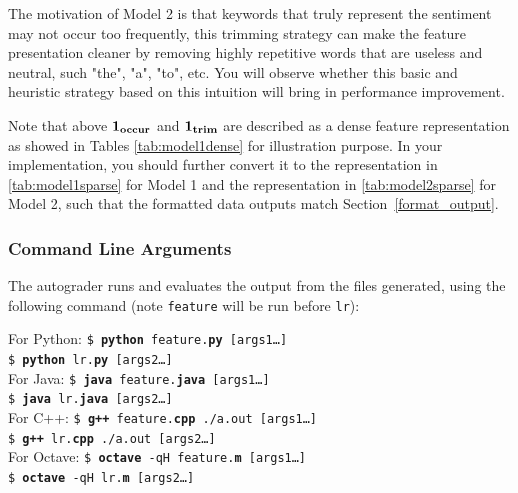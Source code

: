 \documentclass[11pt]{article}
\numberwithin{equation}{section} %
\numberwithin{figure}{section} %
\numberwithin{table}{section} %
\begin{document}
The motivation of Model 2 is that keywords that truly represent the sentiment may not occur too frequently, this trimming strategy can make the feature presentation cleaner by removing highly repetitive words that are useless and neutral, such "the", "a", "to", etc. You will observe whether this basic and heuristic strategy based on this intuition will bring in performance improvement.

Note that above $\bf{1}_{occur}$ and $\bf{1}_{trim}$ are described as a dense feature representation as showed in Tables \ref{tab:model1dense} for illustration purpose. In your implementation, you should further convert it to the representation in \ref{tab:model1sparse} for Model 1 and the representation in \ref{tab:model2sparse} for Model 2, such that the formatted data outputs match Section~\ref{format_output}.



\subsubsection{Command Line Arguments}
The autograder runs and evaluates the output from the files generated, using the following command (note \lstinline{feature} will be run before \lstinline{lr}):

\begin{tabbing}
For Python: \=\texttt{\$ \textbf{python} feature.\textbf{py} [args1\dots]}\\
\>\texttt{\$ \textbf{python} lr.\textbf{py} [args2\dots]}\\
For Java: \>\texttt{\$ \textbf{java} feature.\textbf{java} [args1\dots]}\\
\>\texttt{\$ \textbf{java} lr.\textbf{java} [args2\dots]}\\
For C++: \>\texttt{\$ \textbf{g++} feature.\textbf{cpp} ./a.out [args1\dots]}\\
\>\texttt{\$ \textbf{g++} lr.\textbf{cpp} ./a.out [args2\dots]}\\
For Octave: \>\texttt{\$ \textbf{octave} -qH feature.\textbf{m} [args1\dots]}\\
\>\texttt{\$ \textbf{octave} -qH lr.\textbf{m} [args2\dots]}
\end{tabbing}
\end{document}
